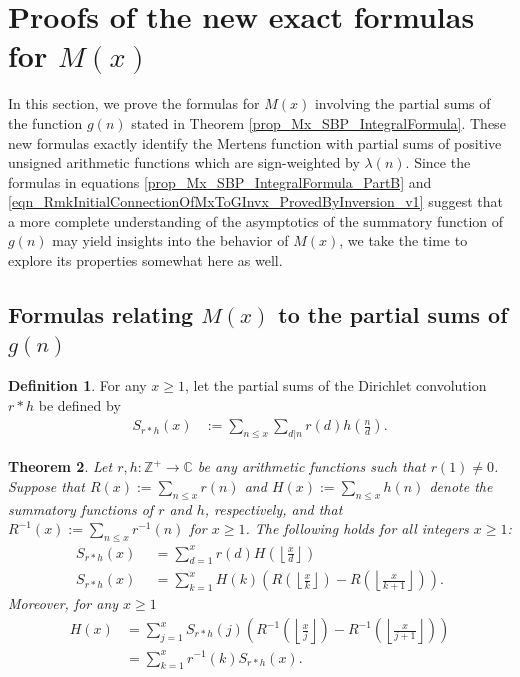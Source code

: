 \documentclass[11pt,reqno,a4letter]{article}
\newcommand{\hlocalref}[1]{\hyperref[#1]{\ref{#1}}}
\numberwithin{equation}{section}
\numberwithin{figure}{section}
\numberwithin{table}{section}
\newcommand{\Floor}[2]{\ensuremath{\left\lfloor \frac{#1}{#2} \right\rfloor}}
\theoremstyle{plain}
\newtheorem{theorem}{Theorem}
\numberwithin{theorem}{section}
\theoremstyle{definition}
\newtheorem{definition}[theorem]{Definition}
\begin{document}
\section{Proofs of the new exact formulas for $M(x)$} 
\label{Section_KeyApplications} 
\label{Section_KeyApplications_NewExactFormulasForMx_FullSectionLabel} 

In this section, we prove the formulas for $M(x)$ involving the partial sums 
of the function $g(n)$ stated in 
Theorem \hlocalref{prop_Mx_SBP_IntegralFormula}. 
These new formulas exactly identify the Mertens function with partial sums of 
positive unsigned arithmetic functions which are sign-weighted by $\lambda(n)$. 
Since the formulas in equations 
\eqref{prop_Mx_SBP_IntegralFormula_PartB} and 
\eqref{eqn_RmkInitialConnectionOfMxToGInvx_ProvedByInversion_v1} 
suggest that a more complete understanding of the 
asymptotics of the summatory function of $g(n)$ may yield insights into the behavior of 
$M(x)$, we take the time to explore its properties somewhat here as well. 

\subsection{Formulas relating $M(x)$ to the partial sums of $g(n)$} 
\label{subSection_KeyApplications_NewExactFormulasForMx} 

\begin{definition}
For any $x \geq 1$, let the partial sums of the Dirichlet convolution $r \ast h$ be defined by 
\begin{align*} 
S_{r \ast h}(x) & := \sum_{n \leq x} \sum_{d|n} r(d) h\left(\frac{n}{d}\right). 
\end{align*}
\end{definition}

\begin{theorem} 
\label{theorem_SummatoryFuncsOfDirCvls} 
Let $r,h: \mathbb{Z}^{+} \rightarrow \mathbb{C}$ be any arithmetic functions such that $r(1) \neq 0$. 
Suppose that $R(x) := \sum_{n \leq x} r(n)$ and $H(x) := \sum_{n \leq x} h(n)$ denote the summatory 
functions of $r$ and $h$, respectively, and that 
$R^{-1}(x) := \sum_{n \leq x} r^{-1}(n)$ for $x \geq 1$. 
The following holds for all integers $x \geq 1$: 
\begin{align*} 
S_{r \ast h}(x) & \phantom{:}= \sum_{d=1}^x r(d) H\left(\Floor{x}{d}\right) \\ 
S_{r \ast h}(x) & \phantom{:}= \sum_{k=1}^{x} H(k) \left(R\left(\Floor{x}{k}\right) - 
     R\left(\Floor{x}{k+1}\right)\right). 
\end{align*} 
Moreover, for any $x \geq 1$ 
\begin{align*} 
H(x) & = \sum_{j=1}^{x} S_{r \ast h}(j) \left(R^{-1}\left(\Floor{x}{j}\right) - 
     R^{-1}\left(\Floor{x}{j+1}\right)\right) \\ 
     & = \sum_{k=1}^{x} r^{-1}(k) S_{r \ast h}(x). 
\end{align*} 
\end{theorem} 
\end{document}
